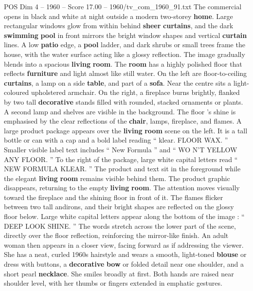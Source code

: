 \begin{textsample}{POS Dim 4 – 1960 – Score 17.00 – 1960/tv\_com\_1960\_91.txt}  \label{ex:f4_pos_064}
The commercial opens in black and white at night outside a modern two-storey \textbf{home}.
Large rectangular windows glow from within behind \textbf{sheer} \textbf{curtains}, and the dark \textbf{swimming} \textbf{pool} in front mirrors the bright window shapes and vertical \textbf{curtain} lines.
A low \textbf{patio} edge, a \textbf{pool} ladder, and dark shrubs or small trees frame the house, with the water surface acting like a glossy reflection.
The image gradually blends into a spacious \textbf{living} \textbf{room}.
The \textbf{room} has a highly polished floor that reflects \textbf{furniture} and light almost like still water.
On the left are floor-to-ceiling \textbf{curtains}, a lamp on a side \textbf{table}, and part of a \textbf{sofa}.
Near the centre sits a light-coloured upholstered armchair.
On the right, a fireplace burns brightly, flanked by two tall \textbf{decorative} stands filled with rounded, stacked ornaments or plants.
A second lamp and shelves are visible in the background.
The floor ’s shine is emphasised by the clear reflections of the \textbf{chair}, lamps, fireplace, and flames.
A large product package appears over the \textbf{living} \textbf{room} scene on the left.
It is a tall bottle or can with a cap and a bold label reading “ klear.
FLOOR WAX. ” Smaller visible label text includes “ New Formula ” and “ WO N’T YELLOW ANY FLOOR. ” To the right of the package, large white capital letters read “ NEW FORMULA KLEAR. ” The product and text sit in the foreground while the elegant \textbf{living} \textbf{room} remains visible behind them.
The product graphic disappears, returning to the empty \textbf{living} \textbf{room}.
The attention moves visually toward the fireplace and the shining floor in front of it.
The flames flicker between two tall andirons, and their bright shapes are reflected on the glossy floor below.
Large white capital letters appear along the bottom of the image : “ DEEP LOOK SHINE. ” The words stretch across the lower part of the scene, directly over the floor reflection, reinforcing the mirror-like finish.
An adult woman then appears in a closer view, facing forward as if addressing the viewer.
She has a neat, curled 1960s hairstyle and wears a smooth, light-toned \textbf{blouse} or dress with buttons, a \textbf{decorative} \textbf{bow} or folded detail near one shoulder, and a short pearl \textbf{necklace}.
She smiles broadly at first.
Both hands are raised near shoulder level, with her thumbs or fingers extended in emphatic gestures.

\end{textsample}
